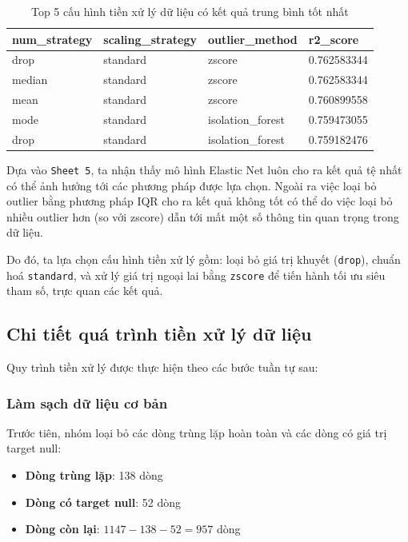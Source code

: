 \documentclass[12pt,a4paper]{article}
\begin{document}
\begin{table}[H]
\centering
\begin{tabular}{|l|l|l|l|}
\hline
\textbf{num\_strategy} & \textbf{scaling\_strategy} & \textbf{outlier\_method} & \textbf{r2\_score}  \\ \hline
drop   & standard & zscore            & 0.762583344 \\ \hline
median & standard & zscore            & 0.762583344 \\ \hline
mean   & standard & zscore            & 0.760899558 \\ \hline
mode   & standard & isolation\_forest & 0.759473055 \\ \hline
drop   & standard & isolation\_forest & 0.759182476 \\ \hline
\end{tabular}
\caption{Top 5 cấu hình tiền xử lý dữ liệu có kết quả trung bình tốt nhất}
\label{tab:top5_preprocess}
\end{table}

Dựa vào \texttt{Sheet 5}, ta nhận thấy mô hình Elastic Net luôn cho ra kết quả tệ nhất có thể ảnh hưởng tới các phương pháp được lựa chọn. Ngoài ra việc loại bỏ outlier bằng phương pháp IQR cho ra kết quả không tốt có thể do việc loại bỏ nhiều outlier hơn (so với zscore) dẫn tới mất một số thông tin quan trọng trong dữ liệu.

Do đó, ta lựa chọn cấu hình tiền xử lý gồm: loại bỏ giá trị khuyết (\texttt{drop}), chuẩn hoá \texttt{standard}, và xử lý giá trị ngoại lai bằng \texttt{zscore} để tiến hành tối ưu siêu tham số, trực quan các kết quả.

\subsection{Chi tiết quá trình tiền xử lý dữ liệu}

Quy trình tiền xử lý được thực hiện theo các bước tuần tự sau:

\subsubsection{Làm sạch dữ liệu cơ bản}

Trước tiên, nhóm loại bỏ các dòng trùng lặp hoàn toàn và các dòng có giá trị target null:
\begin{itemize}
    \item \textbf{Dòng trùng lặp}: 138 dòng
    \item \textbf{Dòng có target null}: 52 dòng
    \item \textbf{Dòng còn lại}: $1147 - 138 - 52 = 957$ dòng
\end{itemize}
\end{document}
